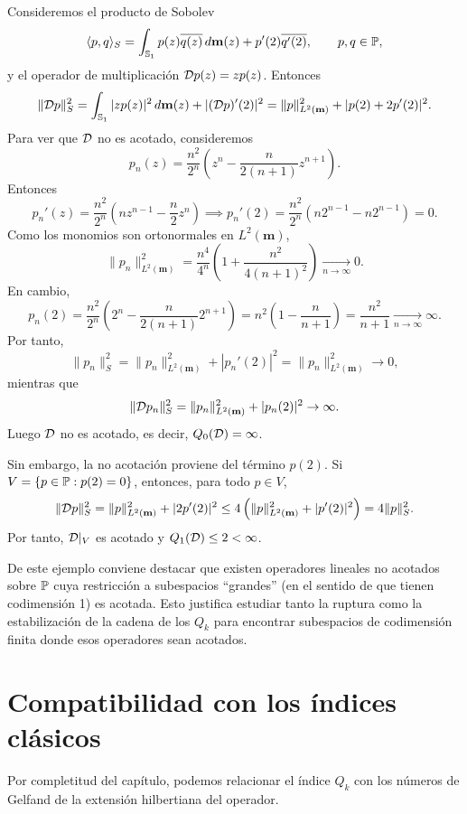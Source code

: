 \begin{exm}
	Consideremos el producto de Sobolev
	\[
		\langle p,q\rangle_S=\int_{\mathbb S_1}p(z)\overline{q(z)}\,d\mathbf m(z)+p'(2)\overline{q'(2)},
		\qquad p,q\in\mathbb{P},
	\]
	y el operador de multiplicación $\mathcal{D} p(z)=zp(z)$. Entonces
	\[
		\|\mathcal{D} p\|_S^2=\int_{\mathbb S_1}|zp(z)|^2\,d\mathbf m(z)+|(\mathcal{D} p)'(2)|^2=\|p\|_{L^2(\mathbf m)}^2+|p(2)+2p'(2)|^2.
	\]
	Para ver que $\mathcal{D}$ no es acotado, consideremos
	\[
		p_n(z) = \frac{n^2}{2^n} \left( z^n - \frac{n}{2(n+1)} z^{n+1} \right).
	\]
	Entonces
	\[
		p_n'(z) = \frac{n^2}{2^n} \left( n z^{n-1} - \frac{n}{2} z^n \right) \implies p_n'(2) = \frac{n^2}{2^n} \left( n 2^{n-1} - n 2^{n-1} \right) = 0.
	\]
	Como los monomios son ortonormales en $L^2(\mathbf m)$,
	\[
		\|p_n\|_{L^2(\mathbf m)}^2 = \frac{n^4}{4^n} \left( 1 + \frac{n^2}{4(n+1)^2} \right) \xrightarrow[n\to\infty]{} 0.
	\]
	En cambio,
	\[
		p_n(2) = \frac{n^2}{2^n} \left( 2^n - \frac{n}{2(n+1)} 2^{n+1} \right) = n^2 \left( 1 - \frac{n}{n+1} \right) = \frac{n^2}{n+1} \xrightarrow[n\to\infty]{} \infty.
	\]
	Por tanto,
	\[
		\|p_n\|_S^2 = \|p_n\|_{L^2(\mathbf m)}^2 + |p_n'(2)|^2 = \|p_n\|_{L^2(\mathbf m)}^2 \to 0,
	\]
	mientras que
	\[
		\|\mathcal{D} p_n\|_S^2 = \|p_n\|_{L^2(\mathbf m)}^2 + |p_n(2)|^2 \to \infty.
	\]
	Luego $\mathcal{D}$ no es acotado, es decir, $Q_0(\mathcal{D})=\infty$.

	Sin embargo, la no acotación proviene del término $p(2)$. Si $V = \{p \in \mathbb{P} : p(2) = 0\}$, entonces, para todo $p \in V$,
	\[
		\|\mathcal{D} p\|_S^2 = \|p\|_{L^2(\mathbf m)}^2 + |2p'(2)|^2 \le 4\left(\|p\|_{L^2(\mathbf m)}^2 + |p'(2)|^2\right) = 4\|p\|_S^2.
	\]
	Por tanto, $\mathcal{D}|_V$ es acotado y $Q_1(\mathcal{D}) \le 2 < \infty$.
\end{exm}

De este ejemplo conviene destacar que existen operadores lineales no acotados sobre $\mathbb{P}$ cuya restricción a subespacios ``grandes'' (en el sentido de que tienen codimensión 1) es acotada. Esto justifica estudiar tanto la ruptura como la estabilización de la cadena de los $Q_k$ para encontrar subespacios de codimensión finita donde esos operadores sean acotados.

\section{Compatibilidad con los índices clásicos}

Por completitud del capítulo, podemos relacionar el índice $Q_k$ con los números de Gelfand de la extensión hilbertiana del operador.


